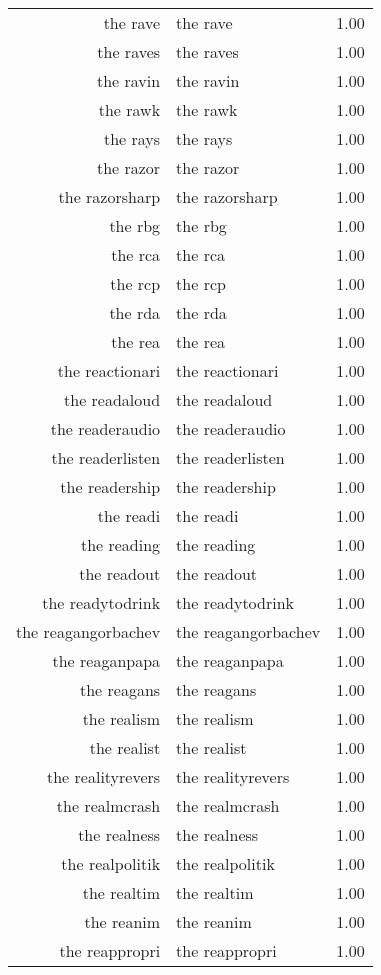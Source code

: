\begin{table}[ht]
\begin{tabular}{rlr}
  the rave & the rave & 1.00 \\ 
  the raves & the raves & 1.00 \\ 
  the ravin & the ravin & 1.00 \\ 
  the rawk & the rawk & 1.00 \\ 
  the rays & the rays & 1.00 \\ 
  the razor & the razor & 1.00 \\ 
  the razorsharp & the razorsharp & 1.00 \\ 
  the rbg & the rbg & 1.00 \\ 
  the rca & the rca & 1.00 \\ 
  the rcp & the rcp & 1.00 \\ 
  the rda & the rda & 1.00 \\ 
  the rea & the rea & 1.00 \\ 
  the reactionari & the reactionari & 1.00 \\ 
  the readaloud & the readaloud & 1.00 \\ 
  the readeraudio & the readeraudio & 1.00 \\ 
  the readerlisten & the readerlisten & 1.00 \\ 
  the readership & the readership & 1.00 \\ 
  the readi & the readi & 1.00 \\ 
  the reading & the reading & 1.00 \\ 
  the readout & the readout & 1.00 \\ 
  the readytodrink & the readytodrink & 1.00 \\ 
  the reagangorbachev & the reagangorbachev & 1.00 \\ 
  the reaganpapa & the reaganpapa & 1.00 \\ 
  the reagans & the reagans & 1.00 \\ 
  the realism & the realism & 1.00 \\ 
  the realist & the realist & 1.00 \\ 
  the realityrevers & the realityrevers & 1.00 \\ 
  the realmcrash & the realmcrash & 1.00 \\ 
  the realness & the realness & 1.00 \\ 
  the realpolitik & the realpolitik & 1.00 \\ 
  the realtim & the realtim & 1.00 \\ 
  the reanim & the reanim & 1.00 \\ 
  the reappropri & the reappropri & 1.00 \\ 

\end{tabular}
\end{table}
